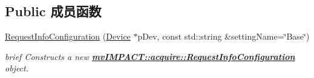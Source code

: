 \subsection*{Public 成员函数}
\begin{DoxyCompactItemize}
\item 
\hyperlink{classmv_i_m_p_a_c_t_1_1acquire_1_1_request_info_configuration_ada3a8f1d27c9a51d603ae3225c9c14d9}{Request\+Info\+Configuration} (\hyperlink{classmv_i_m_p_a_c_t_1_1acquire_1_1_device}{Device} $\ast$p\+Dev, const std\+::string \&setting\+Name=\char`\"{}Base\char`\"{})
\begin{DoxyCompactList}\small\item\em brief Constructs a new {\bfseries \hyperlink{classmv_i_m_p_a_c_t_1_1acquire_1_1_request_info_configuration}{mv\+I\+M\+P\+A\+C\+T\+::acquire\+::\+Request\+Info\+Configuration}} object. \end{DoxyCompactList}\end{DoxyCompactItemize}
